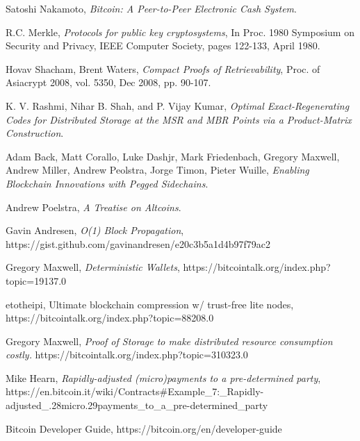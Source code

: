 \documentclass[twocolumn]{article}
\begin{document}
\onecolumn
\begin{thebibliography}{9}

	Satoshi Nakamoto,
	\emph{Bitcoin: A Peer-to-Peer Electronic Cash System}.

	R.C. Merkle,
	\emph{Protocols for public key cryptosystems},
	In Proc. 1980 Symposium on Security and	Privacy,
	IEEE Computer Society, pages 122-133, April 1980.

	Hovav Shacham, Brent Waters,
	\emph{Compact Proofs of Retrievability},
	Proc. of Asiacrypt 2008, vol. 5350, Dec 2008, pp. 90-107.

	K. V. Rashmi, Nihar B. Shah, and P. Vijay Kumar,
	\emph{Optimal Exact-Regenerating Codes for Distributed Storage at the MSR and MBR Points via a Product-Matrix Construction}.

	Adam Back, Matt Corallo, Luke Dashjr, Mark Friedenbach, Gregory Maxwell, Andrew Miller, Andrew Peolstra, Jorge Timon, Pieter Wuille,
	\emph{Enabling Blockchain Innovations with Pegged Sidechains}.

	Andrew Poelstra,
	\emph{A Treatise on Altcoins}.

	Gavin Andresen,
	\emph{O(1) Block Propagation},
	https://gist.github.com/gavinandresen/e20c3b5a1d4b97f79ac2

	Gregory Maxwell,
	\emph{Deterministic Wallets},
	https://bitcointalk.org/index.php?topic=19137.0

	etotheipi,
	Ultimate blockchain compression w/ trust-free lite nodes, \newline
	https://bitcointalk.org/index.php?topic=88208.0

	Gregory Maxwell,
	\emph{Proof of Storage to make distributed resource consumption costly.} \newline
	https://bitcointalk.org/index.php?topic=310323.0

	Mike Hearn,
	\emph{Rapidly-adjusted (micro)payments to a pre-determined party},\newline
	https://en.bitcoin.it/wiki/Contracts\#Example\_7:\_Rapidly-adjusted\_.28micro.29payments\_to\_a\_pre-determined\_party

	Bitcoin Developer Guide,
	https://bitcoin.org/en/developer-guide


\end{thebibliography}
\end{document}
